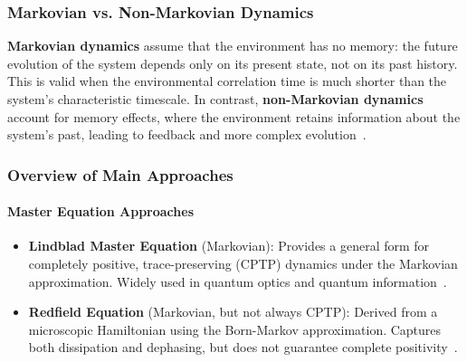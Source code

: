 \subsubsection{Markovian vs. Non-Markovian Dynamics}
\label{subsec:markovian_nonmarkovian}

\noindent
\textbf{Markovian dynamics} assume that the environment has no memory: the future evolution of the system depends only on its present state, not on its past history. This is valid when the environmental correlation time is much shorter than the system's characteristic timescale. In contrast, \textbf{non-Markovian dynamics} account for memory effects, where the environment retains information about the system's past, leading to feedback and more complex evolution~\cite{breuerpetruccione2009theoryopenquantum, rivasetal2014quantumnonmarkovianitycharacterization}.

\subsubsection{Overview of Main Approaches}

\paragraph{Master Equation Approaches}
\begin{itemize}
	\item \textbf{Lindblad Master Equation} (Markovian): Provides a general form for completely positive, trace-preserving (CPTP) dynamics under the Markovian approximation. Widely used in quantum optics and quantum information~\cite{breuerpetruccione2009theoryopenquantum, lindblad1976generatorsquantumdynamical}.
	\item \textbf{Redfield Equation} (Markovian, but not always CPTP): Derived from a microscopic Hamiltonian using the Born-Markov approximation. Captures both dissipation and dephasing, but does not guarantee complete positivity~\cite{redfield1965theoryrelaxationprocesses, rivasetal2014quantumnonmarkovianitycharacterization, lietal2018conceptsquantumnonmarkovianity}.
\end{itemize}

